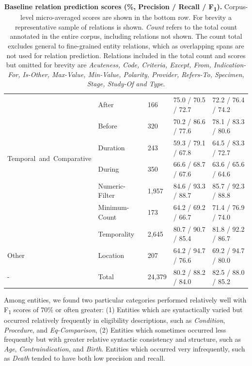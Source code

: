 \documentclass[fleqn,10pt]{wlscirep}
\begin{document}
\begin{table}
\begin{tabular}{m{4.5cm} m{2.5cm} m{2cm} m{2.8cm} m{3cm}}
    \multirow{6}{}[-5pt]{\mbox{Temporal and Comparative}} & After & 166 & 75.0 / 70.5 / 72.7 & 72.2 / 76.4 / 74.2 \\
     &                       Before & 320 & 70.2 / 86.6 / 77.6 & 78.1 / 83.3 / 80.6 \\
     &                       Duration & 243 & 59.3 / 79.1 / 67.8 & 64.5 / 83.3 / 72.7 \\
     &                       During & 350 & 66.6 / 68.7 / 67.6 & 63.6 / 65.6 / 64.6 \\
     &                       Numeric-Filter & 1,957 & 84.6 / 93.3 / 88.7 & 85.7 / 92.3 / 88.8 \\
     &                       Minimum-Count & 173 & 64.2 / 69.2 / 66.7 & 71.4 / 76.9 / 74.0 \\
     &                       Temporality & 2,645 & 80.7 / 90.7 / 85.4 & 81.8 / 92.2 / 86.7 \\
    \hline
    Other &                  Location & 207 & 64.2 / 94.7 / 76.6 & 69.2 / 94.7 / 80.0 \\
    \hline
    - & Total & 24,379 & 80.2 / 88.2 / 84.0 & 82.5 / 88.0 / 85.2
\end{tabular}

    \caption{\textbf{Baseline relation prediction scores (\%, Precision / Recall / F\textsubscript{1}).} Corpus-level micro-averaged scores are shown in the bottom row. For brevity a representative sample of relations is shown. \textit{Count} refers to the total count annotated in the entire corpus, including relations not shown. The count total excludes general to fine-grained entity relations, which as overlapping spans are not used for relation prediction. Relations included in the total count and scores but omitted for brevity are \textit{Acuteness, Code, Criteria, Except, From, Indication-For, Is-Other, Max-Value, Min-Value, Polarity, Provider, Refers-To, Specimen, Stage, Study-Of and Type}.}
    \label{relation_f1}
\end{table}

\noindent Among entities, we found two particular categories performed relatively well with F\textsubscript{1} scores of 70\% or often greater: (1) Entities which are syntactically varied but occurred relatively frequently in eligibility descriptions, such as \textit{Condition}, \textit{Procedure}, and \textit{Eq-Comparison}, (2) Entities which sometimes occurred less frequently but with greater relative syntactic consistency and structure, such as \textit{Age}, \textit{Contraindication}, and \textit{Birth}. Entities which occurred very infrequently, such as \textit{Death} tended to have both low precision and recall. \\
\end{document}
